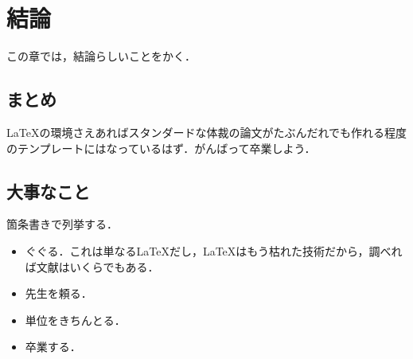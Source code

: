 \chapter{結論}
\label{chap:conclusion}

この章では，結論らしいことをかく．

\section{まとめ}

\LaTeX の環境さえあればスタンダードな体裁の論文がたぶんだれでも作れる程度のテンプレートにはなっているはず．がんばって卒業しよう．


\section{大事なこと}

箇条書きで列挙する．

\begin{itemize}
 \item ぐぐる．これは単なる\LaTeX だし，\LaTeX はもう枯れた技術だから，調べれば文献はいくらでもある．
 \item 先生を頼る．
 \item 単位をきちんとる．
 \item 卒業する．
\end{itemize}


